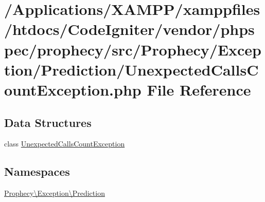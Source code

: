 \hypertarget{_unexpected_calls_count_exception_8php}{}\section{/\+Applications/\+X\+A\+M\+P\+P/xamppfiles/htdocs/\+Code\+Igniter/vendor/phpspec/prophecy/src/\+Prophecy/\+Exception/\+Prediction/\+Unexpected\+Calls\+Count\+Exception.php File Reference}
\label{_unexpected_calls_count_exception_8php}
\subsection*{Data Structures}
\begin{DoxyCompactItemize}
\item 
class \mbox{\hyperlink{class_prophecy_1_1_exception_1_1_prediction_1_1_unexpected_calls_count_exception}{Unexpected\+Calls\+Count\+Exception}}
\end{DoxyCompactItemize}
\subsection*{Namespaces}
\begin{DoxyCompactItemize}
\item 
 \mbox{\hyperlink{namespace_prophecy_1_1_exception_1_1_prediction}{Prophecy\textbackslash{}\+Exception\textbackslash{}\+Prediction}}
\end{DoxyCompactItemize}
